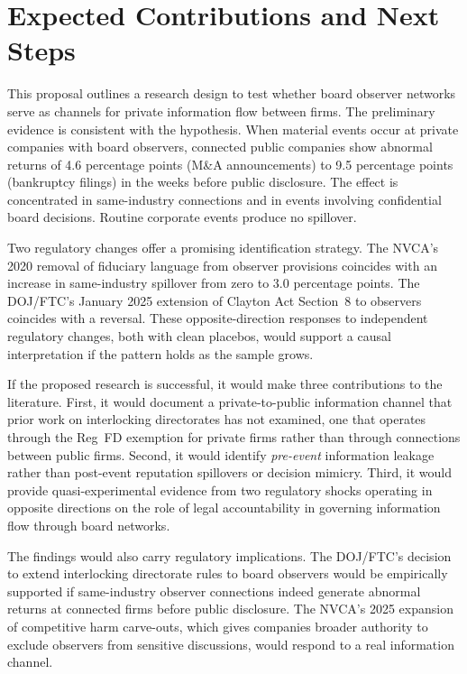 \section{Expected Contributions and Next Steps}
\label{sec:conclusion}

This proposal outlines a research design to test whether board observer networks serve as channels for private information flow between firms. The preliminary evidence is consistent with the hypothesis. When material events occur at private companies with board observers, connected public companies show abnormal returns of 4.6 percentage points (M\&A announcements) to 9.5 percentage points (bankruptcy filings) in the weeks before public disclosure. The effect is concentrated in same-industry connections and in events involving confidential board decisions. Routine corporate events produce no spillover.

Two regulatory changes offer a promising identification strategy. The NVCA's 2020 removal of fiduciary language from observer provisions coincides with an increase in same-industry spillover from zero to 3.0 percentage points. The DOJ/FTC's January 2025 extension of Clayton Act Section~8 to observers coincides with a reversal. These opposite-direction responses to independent regulatory changes, both with clean placebos, would support a causal interpretation if the pattern holds as the sample grows.

If the proposed research is successful, it would make three contributions to the literature. First, it would document a private-to-public information channel that prior work on interlocking directorates has not examined, one that operates through the Reg~FD exemption for private firms rather than through connections between public firms. Second, it would identify \textit{pre-event} information leakage rather than post-event reputation spillovers or decision mimicry. Third, it would provide quasi-experimental evidence from two regulatory shocks operating in opposite directions on the role of legal accountability in governing information flow through board networks.

The findings would also carry regulatory implications. The DOJ/FTC's decision to extend interlocking directorate rules to board observers would be empirically supported if same-industry observer connections indeed generate abnormal returns at connected firms before public disclosure. The NVCA's 2025 expansion of competitive harm carve-outs, which gives companies broader authority to exclude observers from sensitive discussions, would respond to a real information channel.

